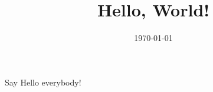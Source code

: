 \documentclass[a4paper]{article}
\title{Hello, World!}
\date{\today}
\begin{document}
\maketitle

Say Hello everybody!
\end{document}
